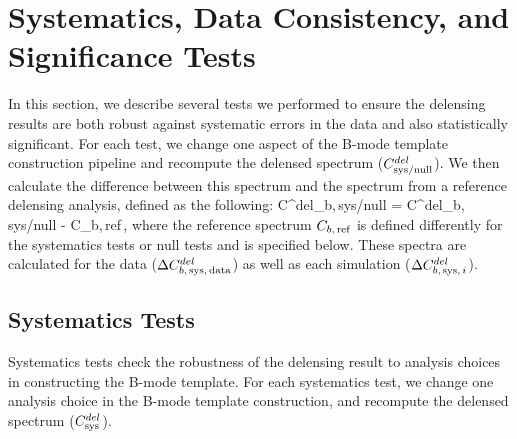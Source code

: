 \section{Systematics, Data Consistency, and Significance Tests}
\label{sec:sys-null-sign}
In this section, we describe several tests we performed to ensure the delensing results are both robust against systematic errors in the data and also statistically significant.
For each test, we change one aspect of the B-mode template construction pipeline and recompute the delensed spectrum ($C^{del}_{\rm sys/null}$).
We then calculate the difference between this spectrum and the spectrum from a reference delensing analysis,
defined as the following:
\beq
\label{eqn:delta_test2}
  \Delta C^{del}_{b,\,{\rm sys/null}} = C^{del}_{b,\,{\rm sys/null}} - C_{b,\,{\rm ref}}\,,
\eeq
where the reference spectrum $C_{b,\,{\rm ref}}$ is defined differently for the systematics tests or null tests and is specified below.
These spectra are calculated for the data ($\Delta C^{del}_{b,\,{\rm sys},\,{\rm data}}$) as well as each simulation ($\Delta C^{del}_{b,\,{\rm sys},\,i}$).


\subsection{Systematics Tests}
\label{sec:sys}
Systematics tests check the robustness of the delensing result to analysis choices in constructing the B-mode template.
For each systematics test, we change one analysis choice in the B-mode template construction, and recompute the delensed spectrum ($C^{del}_{\rm sys}$).

